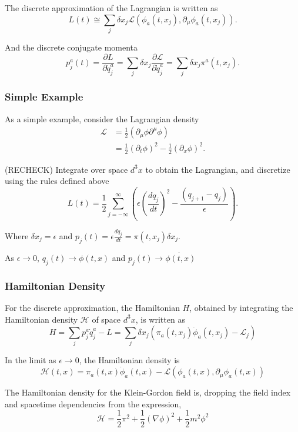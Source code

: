 \noindent The discrete approximation of the Lagrangian is written as 
\begin{equation}
L(t) \cong \sum_j \delta x_j \mathscr{L}(\phi_a(t, x_j), \partial_\mu \phi_a(t, x_j)). 
\end{equation}

\noindent And the discrete conjugate momenta 
\begin{equation}
p_j^a(t) = \frac{\partial L}{\partial \dot{q}_j^a} = \sum_j \delta x_j \frac{\partial \mathscr{L}}{\partial \dot{q}_j^a} = \sum_j \delta x_j \pi^a(t, x_j).
\end{equation}

\subsubsection*{Simple Example}

\noindent As a simple example, consider the Lagrangian density 
\begin{align}
\mathscr{L} &= \frac{1}{2} (\partial_\mu \phi \partial^\mu \phi) \\
&= \frac{1}{2}(\partial_t \phi)^2 - \frac{1}{2} (\partial_x \phi)^2 .
\end{align}

\noindent (RECHECK) Integrate over space $d^3 x$ to obtain the Lagrangian, and discretize using the rules defined above
\begin{equation}
L(t) = \frac{1}{2} \sum_{j=-\infty}^{\infty} \left( \epsilon \left( \frac{d q_j}{d t} \right)^2 - \frac{(q_{j+1} - q_j)}{\epsilon} \right) .
\end{equation}

\noindent Where $\delta x_j = \epsilon$ and $p_j(t) = \epsilon \frac{d q_j}{dt} = \pi(t, x_j) \delta x_j $. 

\noindent As $\epsilon \rightarrow 0$, $q_j(t) \rightarrow \phi(t, x)$ and $p_j(t) \rightarrow \dot{\phi(t, x)}$

\subsubsection*{Hamiltonian Density}

\noindent For the discrete approximation, the Hamiltonian $H$, obtained by integrating the Hamiltonian density $\mathscr{H}$ of space $d^3 x$, is written as 
\begin{equation}
H = \sum_j p_j^a \dot{q}_j^a - L = \sum_j \delta x_j ( \pi_a(t, x_j) \dot{\phi}_a(t, x_j) - \mathcal{L}_j )
\end{equation}

\noindent In the limit as $\epsilon \rightarrow 0$, the Hamiltonian density is 
\begin{equation}
\mathscr{H}(t, x) = \pi_a(t, x) \dot{\phi}_a(t, x) - \mathscr{L} \left( \phi_a(t, x), \partial_\mu \phi_a(t,x) \right)
\end{equation}

\noindent The Hamiltonian density for the Klein-Gordon field is, dropping the field index and spacetime dependencies from the expression, 
\begin{equation}
\mathscr{H} = \frac{1}{2}\pi^2 + \frac{1}{2}(\nabla \phi)^2 + \frac{1}{2} m^2 \phi^2
\end{equation}
